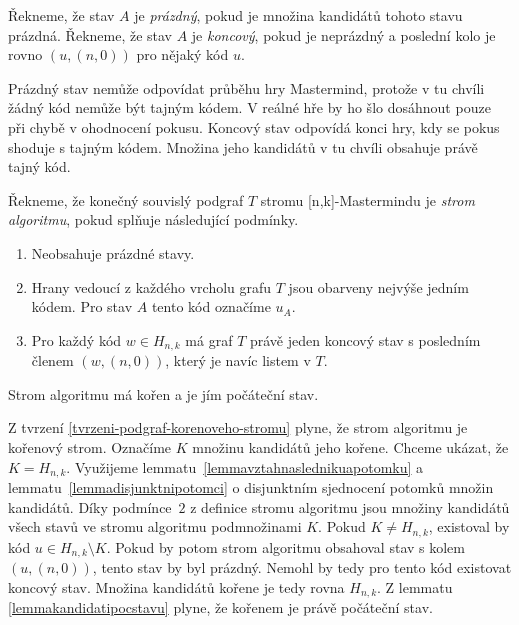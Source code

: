 \begin{definice}\label{kandidat}
  Řekneme, že stav $A$ je \emph{prázdný}, pokud je množina kandidátů tohoto stavu prázdná. Řekneme, že stav $A$ je \emph{koncový}, pokud je neprázdný a poslední kolo je rovno $(u,(n,0))$ pro nějaký kód $u$.
\end{definice}

Prázdný stav nemůže odpovídat průběhu hry Mastermind, protože v tu chvíli žádný kód nemůže být tajným kódem. V reálné hře by ho šlo dosáhnout pouze při chybě v ohodnocení pokusu. Koncový stav odpovídá konci hry, kdy se pokus shoduje s tajným kódem. Množina jeho kandidátů v tu chvíli obsahuje právě tajný kód. 


\begin{definice}
  Řekneme, že konečný souvislý podgraf $T$ stromu [n,k]-Mastermindu je \emph{strom algoritmu}, pokud splňuje následující podmínky.
  \begin{enumerate}
      \item Neobsahuje prázdné stavy.
      \item Hrany vedoucí z každého vrcholu grafu $T$ jsou obarveny nejvýše jedním kódem. Pro stav $A$ tento kód označíme $u_A$.
      \item Pro každý kód $w \in H_{n,k}$ má graf $T$ právě jeden koncový stav s posledním členem $(w, (n,0))$, který je navíc listem v $T$.
  \end{enumerate}
\end{definice}

\begin{tvrz}\label{tvrzkorenstromualg}
    Strom algoritmu má kořen a je jím počáteční stav. 
\end{tvrz}
\begin{dukaz}
    Z tvrzení \ref{tvrzeni-podgraf-korenoveho-stromu} plyne, že strom algoritmu je kořenový strom. Označíme $K$ množinu kandidátů jeho kořene. Chceme ukázat, že $K = H_{n,k}$.
    Využijeme lemmatu~\ref{lemmavztahnaslednikuapotomku} a lemmatu~\ref{lemmadisjunktnipotomci} o disjunktním sjednocení potomků množin kandidátů. Díky podmínce~$2$ z definice stromu algoritmu jsou množiny kandidátů všech stavů ve stromu algoritmu podmnožinami $K$. Pokud $K \neq H_{n,k}$, existoval by kód $u \in H_{n,k} \setminus K$. Pokud by potom strom algoritmu obsahoval stav s kolem $(u, (n,0))$, tento stav by byl prázdný. Nemohl by tedy pro tento kód existovat koncový stav. Množina kandidátů kořene je tedy rovna $H_{n,k}$. Z lemmatu \ref{lemmakandidatipocstavu} plyne, že kořenem je právě počáteční stav. 
\end{dukaz}

